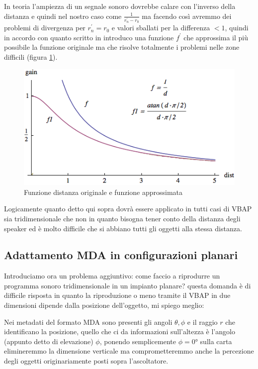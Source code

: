 \documentclass[12pt,a4paper]{report}
\begin{document}
In teoria l'ampiezza di un segnale sonoro dovrebbe calare con l'inverso della distanza e quindi nel nostro caso come $\frac{1}{r_n^{\prime}-r_0}$ ma facendo così avremmo dei problemi di divergenza per $r_n^{\prime}=r_0$ e valori sballati per la differenza $<1$, quindi in accordo con quanto scritto in \cite{distanza} introduco una funzione $f^{\prime}$ che approssima il più possibile la funzione originale ma che risolve totalmente i problemi nelle zone difficili (figura \ref{fig:distance}).

\begin{figure}[htbp]
	\centering
	\includegraphics[scale=0.60]{figures/distance.png}
	\caption {Funzione distanza originale e funzione approssimata}
	\label{fig:distance}
	\end{figure}

Logicamente quanto detto qui sopra dovrà essere applicato in tutti casi di VBAP sia tridimensionale che non in quanto bisogna tener conto della distanza degli speaker ed è molto difficile che si abbiano tutti gli oggetti alla stessa distanza.

\subsection{Adattamento MDA in configurazioni planari}

Introduciamo ora un problema aggiuntivo: come faccio a riprodurre un programma sonoro tridimensionale in un impianto planare? questa domanda è di difficile risposta in quanto la riproduzione o meno tramite il VBAP in due dimensioni dipende dalla posizione dell'oggetto, mi spiego meglio:

Nei metadati del formato MDA sono presenti gli angoli $\theta, \phi$ e il raggio $r$ che identificano la posizione, quello che ci da informazioni sull'altezza è l'angolo (appunto detto di elevazione) $\phi$, ponendo semplicemente $\phi=0°$ sulla carta elimineremmo la dimensione verticale ma comprometteremmo anche la percezione degli oggetti originariamente posti sopra l'ascoltatore.
\end{document}
